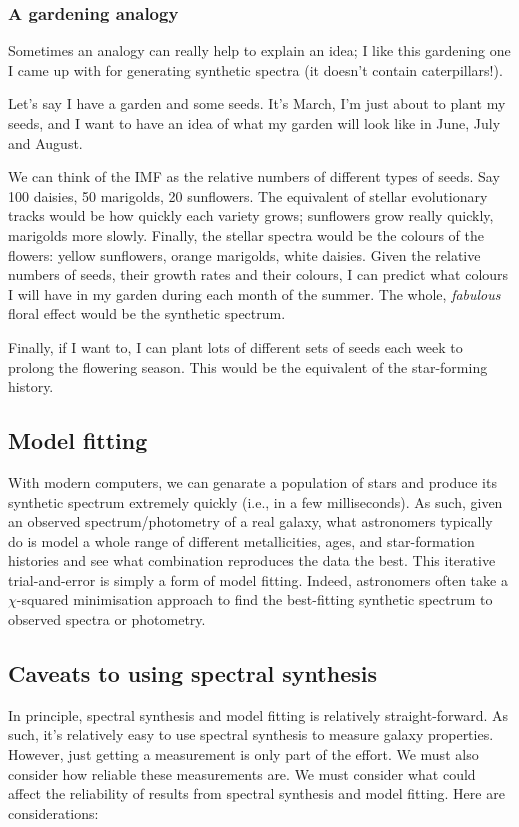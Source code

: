 \documentclass[11pt]{article}
\begin{document}
\subsubsection{A gardening analogy}
Sometimes an analogy can really help to explain an idea; I like this
gardening one I came up with for generating synthetic spectra (it
doesn't contain caterpillars!).

Let's say I have a garden and some seeds. It's March, I'm just about
to plant my seeds, and I want to have an idea of what my garden will
look like in June, July and August.

We can think of the IMF as the relative numbers of different types of
seeds. Say 100 daisies, 50 marigolds, 20 sunflowers. The equivalent of
stellar evolutionary tracks would be how quickly each variety grows;
sunflowers grow really quickly, marigolds more slowly. Finally, the
stellar spectra would be the colours of the flowers: yellow
sunflowers, orange marigolds, white daisies. Given the relative
numbers of seeds, their growth rates and their colours, I can predict
what colours I will have in my garden during each month of the
summer. The whole, {\it fabulous} floral effect would be the synthetic
spectrum.

Finally, if I want to, I can plant lots of different sets of seeds
each week to prolong the flowering season. This would be the
equivalent of the star-forming history.

\subsection{Model fitting}
With modern computers, we can genarate a population of stars and
produce its synthetic spectrum extremely quickly (i.e., in a few
milliseconds). As such, given an observed spectrum/photometry of a
real galaxy, what astronomers typically do is model a whole range of
different metallicities, ages, and star-formation histories and see
what combination reproduces the data the best. This iterative
trial-and-error is simply a form of model fitting. Indeed, astronomers
often take a $\chi$-squared minimisation approach to find the
best-fitting synthetic spectrum to observed spectra or photometry.

\subsection{Caveats to using spectral synthesis}
In principle, spectral synthesis and model fitting is relatively
straight-forward. As such, it's relatively easy to use spectral
synthesis to measure galaxy properties. However, just getting a
measurement is only part of the effort. We must also consider how
reliable these measurements are. We must consider what could affect
the reliability of results from spectral synthesis and model
fitting. Here are considerations:
\end{document}
